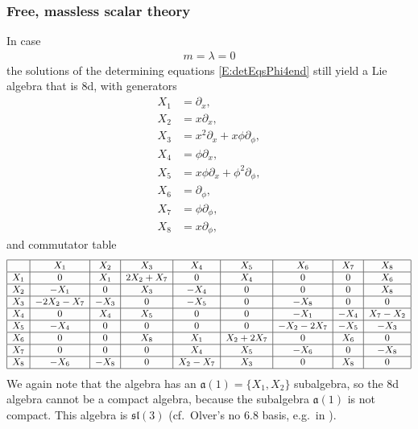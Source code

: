 \documentclass[a4paper,hidelinks, 12pt]{article}
\numberwithin{equation}{section}
\theoremstyle{plain}
\newcommand{\La}{\mathfrak}
\begin{document}
\subsubsection{Free, massless scalar theory}
\label{sec:MasslessScalarTheory}
In case  
\begin{align}
	m=\lambda=0
\end{align}
the solutions of the determining equations \eqref{E:detEqsPhi4end} still yield a Lie algebra that is 8d, with generators
\begin{align}\label{E:generatorsMasslessScalarTh}
	X_1 &=  \partial_x, \nonumber \\
X_2 &= x\partial_x, \nonumber \\
X_3 &= x^2\partial_x +x\phi \partial_\phi, \nonumber \\
X_4 &= \phi \partial_x, \nonumber \\
X_5 &=x \phi \partial_x +\phi^2 \partial_\phi, \nonumber \\
	X_6 &= \partial_\phi , \nonumber \\
	X_7 &= \phi \partial_\phi, \nonumber \\
	X_8 &= x\partial_\phi,
\end{align}
and commutator table
\begin{align}\label{T:commm=0}
\small{	\begin{array}{|c|c|c|c|c|c|c|c|c|}
	 \hline
 \text{} & X_1 & X_2 & X_3 & X_4 & X_5 & X_6 & X_7 & X_8 \\
 \hline X_1 & 0 & X_1 & 2 X_2+X_7 & 0 & X_4 & 0 & 0 & X_6 \\
 \hline X_2 & -X_1 & 0 & X_3 & -X_4 & 0 & 0 & 0 & X_8 \\
 \hline X_3 & -2 X_2-X_7 & -X_3 & 0 & -X_5 & 0 & -X_8 & 0 & 0 \\
 \hline X_4 & 0 & X_4 & X_5 & 0 & 0 & -X_1 & -X_4 & X_7-X_2 \\
 \hline X_5 & -X_4 & 0 & 0 & 0 & 0 & -X_2-2 X_7 & -X_5 & -X_3 \\
 \hline X_6 & 0 & 0 & X_8 & X_1 & X_2+2 X_7 & 0 & X_6 & 0 \\
 \hline X_7 & 0 & 0 & 0 & X_4 & X_5 & -X_6 & 0 & -X_8 \\
 \hline X_8 & -X_6 & -X_8 & 0 & X_2-X_7 & X_3 & 0 & X_8 & 0 \\
 \hline
\end{array} }%
\end{align}
We again note that the algebra has an $\La{a}(1)=\{X_1,X_2\}$ subalgebra, so
the 8d algebra cannot be a compact algebra, because the subalgebra $\La{a}(1)$ is not compact. This algebra is $\La{sl}(3)$ (cf.~Olver's no 6.8 basis, e.g.~in \cite{laine2003classification}). 
\end{document}
